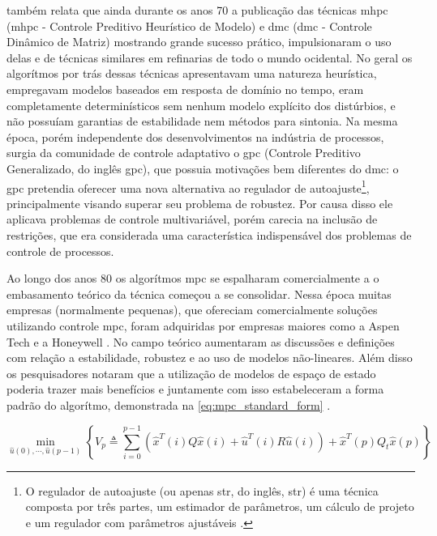  também relata que ainda durante os anos 70 a publicação das técnicas
\acrlong{mhpc} (\acrshort{mhpc} - Controle Preditivo Heurístico de Modelo) e
\acrlong{dmc} (\acrshort{dmc} - Controle Dinâmico de Matriz) mostrando grande sucesso prático,
impulsionaram o uso delas e de técnicas similares em refinarias de todo o mundo ocidental.
No geral os algorítmos por trás dessas técnicas apresentavam uma natureza heurística,
empregavam modelos baseados em resposta de domínio no tempo, eram completamente determinísticos
sem nenhum modelo explícito dos distúrbios, e não possuíam garantias de estabilidade nem
métodos para sintonia. Na mesma época, porém independente dos desenvolvimentos na indústria
de processos, surgia da comunidade de controle adaptativo o \acrshort{gpc} (Controle Preditivo
Generalizado, do inglês \acrlong{gpc}), que possuia motivações bem diferentes do \acrshort{dmc}:
o \acrshort{gpc} pretendia oferecer uma nova alternativa ao regulador de autoajuste\footnote{
    O regulador de autoajuste (ou apenas \acrshort{str}, do inglês, \acrlong{str}) é uma técnica composta
    por três partes, um estimador de parâmetros, um cálculo de projeto e um regulador com
    parâmetros ajustáveis \cite{Astrom1985}.
}, 
principalmente visando superar seu problema de robustez. Por causa disso ele aplicava problemas de controle
multivariável, porém carecia na inclusão de restrições, que era considerada uma característica
indispensável dos problemas de controle de processos.

Ao longo dos anos 80 os algorítmos \acrshort{mpc} se espalharam comercialmente a o embasamento
teórico da técnica começou a se consolidar. Nessa época muitas empresas (normalmente pequenas),
que ofereciam comercialmente soluções utilizando controle \acrshort{mpc}, foram adquiridas por
empresas maiores como a Aspen Tech e a Honeywell \cite{Lee2011}. No campo teórico aumentaram as discussões e
definições com relação a estabilidade, robustez e ao uso de modelos não-lineares. Além disso
os pesquisadores notaram que a utilização de modelos de espaço de estado poderia trazer mais
benefícios e juntamente com isso estabeleceram a forma padrão do algorítmo, demonstrada na
\cref{eq:mpc_standard_form} \cite{Lee2011} .

\begin{equation}
	\label{eq:mpc_standard_form}
    \min_{\hat{u}(0),\cdots,\hat{u}(p-1)}
    \left\{
        V_p \triangleq \displaystyle\sum_{i=0}^{p-1}
            \left(\hat{x}^T(i)Q\hat{x}(i) + \hat{u}^T(i)R\hat{u}(i) \right)
            + \hat{x}^T(p)Q_t\hat{x}(p)
    \right\}
\end{equation}

